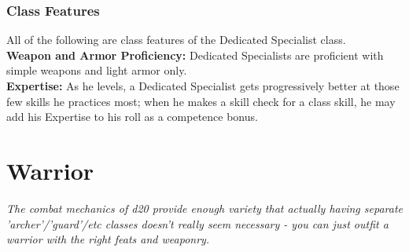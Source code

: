 \documentclass[11pt]{report}
\begin{document}
\subsubsection{Class Features}
All of the following are class features of the Dedicated Specialist class. \\
\textbf{Weapon and Armor Proficiency:} Dedicated Specialists are proficient with
simple weapons and light armor only. \\
\textbf{Expertise:} As he levels, a Dedicated Specialist gets progressively
better at those few skills he practices most; when he makes a skill check for a
class skill, he may add his Expertise to his roll as a competence bonus.

\section{Warrior}
\textit{The combat mechanics of d20 provide enough variety that actually having
separate 'archer'/'guard'/etc classes doesn't really seem necessary - you can
just outfit a warrior with the right feats and weaponry.}
\end{document}
